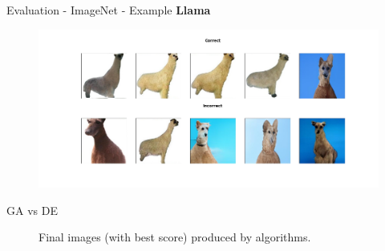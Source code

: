 \documentclass[t]{beamer}
\begin{document}
\begin{frame}[c]{Evaluation - ImageNet - Example}
\textbf{Llama}
\begin{figure}
    \centering
    \includegraphics[scale=0.25]{llama.png}
\end{figure} 
\end{frame}

\begin{frame}{GA vs DE}
\begin{figure}[h]
    \centering
    \qquad
    \caption{Final images (with best score) produced by algorithms.}
\end{figure}
\end{frame}
\end{document}
